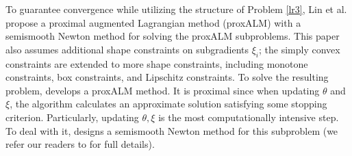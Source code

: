 \documentclass{article}
\begin{document}
To guarantee convergence while utilizing the structure of Problem \eqref{lr3}, Lin et al. \cite{Lin22} propose a proximal augmented Lagrangian method (proxALM) with a semismooth Newton method for solving the proxALM subproblems. This paper also assumes additional shape constraints on subgradients $\xi_i$; the simply convex constraints are extended to more shape constraints, including monotone constraints, box constraints, and Lipschitz constraints. To solve the resulting problem, \cite{Lin22} develops a proxALM method. It is proximal since when updating $\theta$ and $\xi$, the algorithm calculates an approximate solution satisfying some stopping criterion. Particularly, updating $\theta,\xi$ is the most computationally intensive step. To deal with it, \cite{Lin22} designs a semismooth Newton method for this subproblem (we refer our readers to \cite{Lin22} for full details). 



\end{document}

